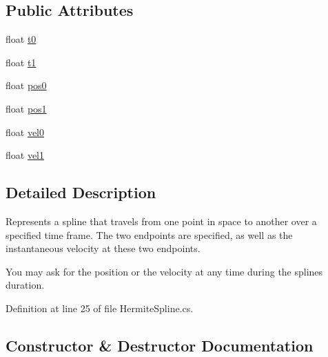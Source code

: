 \subsection*{Public Attributes}
\begin{DoxyCompactItemize}
\item 
float \mbox{\hyperlink{struct_leap_1_1_unity_1_1_animation_1_1_hermite_spline_a2d1381278deb0c8a20be0162ffd9106a}{t0}}
\item 
float \mbox{\hyperlink{struct_leap_1_1_unity_1_1_animation_1_1_hermite_spline_a68d2fbf1f78bfff7933605b9480775a0}{t1}}
\item 
float \mbox{\hyperlink{struct_leap_1_1_unity_1_1_animation_1_1_hermite_spline_a98993395f6b4ba8c68e7bcfe827bf308}{pos0}}
\item 
float \mbox{\hyperlink{struct_leap_1_1_unity_1_1_animation_1_1_hermite_spline_ac124f1bd8febef9b9472856c383e9698}{pos1}}
\item 
float \mbox{\hyperlink{struct_leap_1_1_unity_1_1_animation_1_1_hermite_spline_ace4a3fb92bc4e44b6a844da6fb7c5a2b}{vel0}}
\item 
float \mbox{\hyperlink{struct_leap_1_1_unity_1_1_animation_1_1_hermite_spline_a99576b3c8cd67280f5ec30a1e2555c9b}{vel1}}
\end{DoxyCompactItemize}


\subsection{Detailed Description}
Represents a spline that travels from one point in space to another over a specified time frame. The two endpoints are specified, as well as the instantaneous velocity at these two endpoints. 

You may ask for the position or the velocity at any time during the splines duration. 

Definition at line 25 of file Hermite\+Spline.\+cs.



\subsection{Constructor \& Destructor Documentation}
\mbox{\label{struct_leap_1_1_unity_1_1_animation_1_1_hermite_spline_a22789bb3930bf61ef82cd091a06766d9}} 
